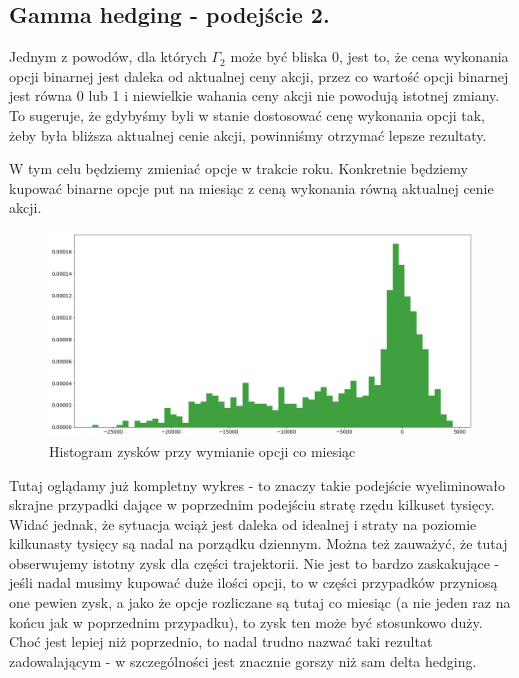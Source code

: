 \documentclass[12pt]{article}
\begin{document}
\subsection{Gamma hedging - podejście 2.}

Jednym z powodów, dla których $\Gamma_2$ może być bliska 0, jest to, że cena wykonania opcji binarnej jest daleka od aktualnej ceny akcji, przez co wartość opcji binarnej jest równa 0 lub 1 i niewielkie wahania ceny akcji nie powodują istotnej zmiany. To sugeruje, że gdybyśmy byli w stanie dostosować cenę wykonania opcji tak, żeby była bliższa aktualnej cenie akcji, powinniśmy otrzymać lepsze rezultaty.

W tym celu będziemy zmieniać opcje w trakcie roku. Konkretnie będziemy kupować binarne opcje put na miesiąc z ceną wykonania równą aktualnej cenie akcji. 

\begin{figure}[htp]
    \centering
    \includegraphics[width=\textwidth,height=\textheight,keepaspectratio]{gammarestock30.png}
    \caption{Histogram zysków przy wymianie opcji co miesiąc}
    \label{fig:gammarestock}
\end{figure}

Tutaj oglądamy już kompletny wykres - to znaczy takie podejście wyeliminowało skrajne przypadki dające w poprzednim podejściu stratę rzędu kilkuset tysięcy. Widać jednak, że sytuacja wciąż jest daleka od idealnej i straty na poziomie kilkunasty tysięcy są nadal na porządku dziennym. Można też zauważyć, że tutaj obserwujemy istotny zysk dla części trajektorii. Nie jest to bardzo zaskakujące - jeśli nadal musimy kupować duże ilości opcji, to w części przypadków przyniosą one pewien zysk, a jako że opcje rozliczane są tutaj co miesiąc (a nie jeden raz na końcu jak w poprzednim przypadku), to zysk ten może być stosunkowo duży. 
Choć jest lepiej niż poprzednio, to nadal trudno nazwać taki rezultat zadowalającym - w szczególności jest znacznie gorszy niż sam delta hedging.
\end{document}

